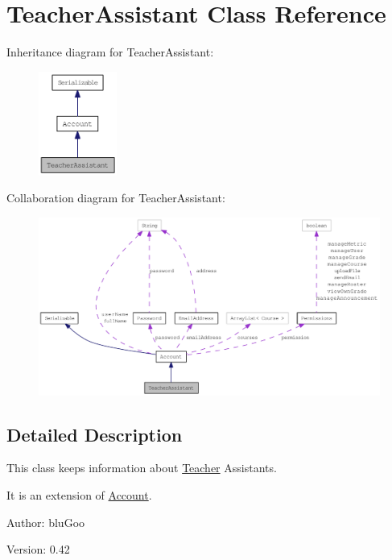 \hypertarget{classTeacherAssistant}{
\section{TeacherAssistant Class Reference}
\label{classTeacherAssistant}
}
Inheritance diagram for TeacherAssistant:\nopagebreak
\begin{figure}[H]
\begin{center}
\leavevmode
\includegraphics[width=73pt]{classTeacherAssistant__inherit__graph}
\end{center}
\end{figure}
Collaboration diagram for TeacherAssistant:\nopagebreak
\begin{figure}[H]
\begin{center}
\leavevmode
\includegraphics[width=400pt]{classTeacherAssistant__coll__graph}
\end{center}
\end{figure}


\subsection{Detailed Description}
This class keeps information about \hyperlink{classTeacher}{Teacher} Assistants. 

It is an extension of \hyperlink{classAccount}{Account}.

\begin{Desc}
\item[Author:]bluGoo \end{Desc}
\begin{Desc}
\item[Version:]0.42 \end{Desc}


